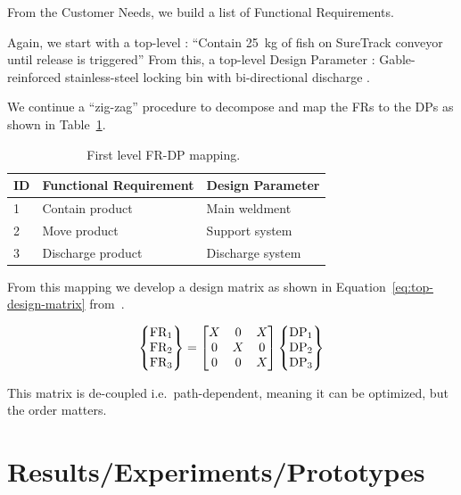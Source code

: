\documentclass[sn-mathphys,pdflatex]{sn-jnl}%
\theoremstyle{thmstyleone}%
\theoremstyle{thmstyletwo}%
\theoremstyle{thmstylethree}%
\begin{document}
From the Customer Needs, we build a list of Functional Requirements.

Again, we start with a top-level : ``Contain \SI{25}{\kilogram} of fish on SureTrack conveyor until release is triggered''
From this, a top-level Design Parameter : Gable-reinforced stainless-steel locking bin with bi-directional discharge
\cite{gerhard2016suretrack}.

We continue a ``zig-zag'' procedure to decompose and map the FRs to the DPs as shown in Table~\ref{tab:first_level-frdp}.

\begin{table}
  \center
  \caption{First level FR-DP mapping.~\cite{gerhard2016suretrack}}\label{tab:first_level-frdp}
  \begin{tabular}{lll} \toprule
    ID& Functional Requirement & Design Parameter \\ \midrule 
    1&Contain product&Main weldment\\
    2&Move product&Support system\\
    3&Discharge product &Discharge system\\
    \bottomrule
  \end{tabular}
\end{table}

From this mapping we develop a design matrix as shown in Equation~\ref{eq:top-design-matrix} from~\cite{gerhard2016suretrack}.

\begin{equation}\label{eq:top-design-matrix}
\begin{Bmatrix}
\text{FR}_{1}\\
\text{FR}_{2}\\
\text{FR}_{3}
\end{Bmatrix}=
\begin{bmatrix}
X &  0 & X\\
0 &  X & 0\\
0 &  0 & X
\end{bmatrix}
\begin{Bmatrix}
\text{DP}_{1}\\
\text{DP}_{2}\\
\text{DP}_{3}
\end{Bmatrix}
\end{equation}

This matrix is de-coupled i.e.\ path-dependent, meaning it can be optimized, but the order matters.

\section{Results/Experiments/Prototypes}\label{sec:rep}
\end{document}
